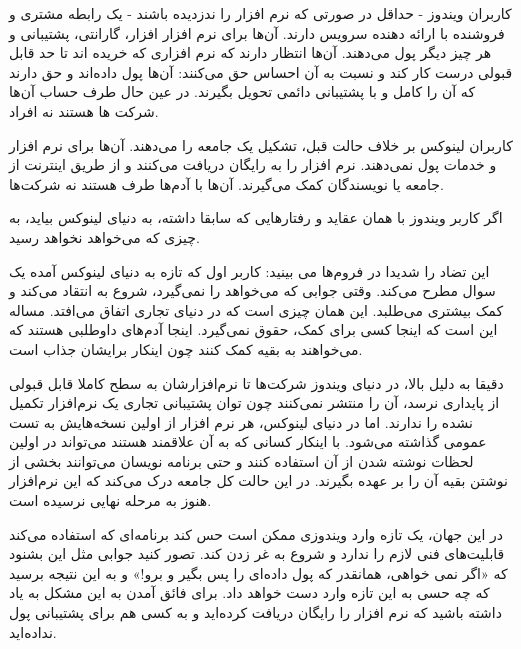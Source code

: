 کاربران ویندوز - حداقل در صورتی که نرم افزار را ندزدیده باشند - یک رابطه مشتری و فروشنده با ارائه دهنده سرویس دارند. آن‌ها برای نرم افزار افزار، گارانتی، پشتیبانی و هر چیز دیگر پول می‌دهند. آن‌ها انتظار دارند که نرم افزاری که خریده اند تا حد قابل قبولی درست کار کند و نسبت به آن احساس حق می‌کنند: آن‌ها پول داده‌اند و حق دارند که آن را کامل و با پشتیبانی دائمی تحویل بگیرند. در عین حال طرف حساب آن‌ها شرکت ها هستند نه افراد.

کاربران لینوکس بر خلاف حالت قبل، تشکیل یک جامعه را می‌دهند. آن‌ها برای نرم افزار و خدمات پول نمی‌دهند. نرم افزار را به رایگان دریافت می‌کنند و از طریق اینترنت از جامعه یا نویسندگان کمک می‌گیرند. آن‌ها با آدم‌ها طرف هستند نه شرکت‌ها.

اگر کاربر ویندوز با همان عقاید و رفتارهایی که سابقا داشته، به دنیای لینوکس بیاید، به چیزی که می‌خواهد نخواهد رسید.

این تضاد را شدیدا در فروم‌ها می بینید: کاربر اول که تازه به دنیای لینوکس آمده یک سوال مطرح می‌کند. وقتی جوابی که می‌خواهد را نمی‌گیرد، شروع به انتقاد می‌کند و کمک بیشتری می‌طلبد. این همان چیزی است که در دنیای تجاری اتفاق می‌افتد. مساله این است که اینجا کسی برای کمک، حقوق نمی‌گیرد. اینجا آدم‌های داوطلبی هستند که می‌خواهند به بقیه کمک کنند چون اینکار برایشان جذاب است.

دقیقا به دلیل بالا، در دنیای ویندوز شرکت‌ها تا نرم‌افزارشان به سطح کاملا قابل قبولی از پایداری نرسد، آن را منتشر نمی‌کنند چون توان پشتیبانی تجاری یک نرم‌افزار تکمیل نشده را ندارند. اما در دنیای لینوکس، هر نرم افزار از اولین نسخه‌هایش به تست عمومی گذاشته می‌شود. با اینکار کسانی که به آن علاقمند هستند می‌تواند در اولین لحظات نوشته شدن از آن استفاده کنند و حتی برنامه نویسان می‌توانند بخشی از نوشتن بقیه آن را بر عهده بگیرند. در این حالت کل جامعه درک می‌کند که این نرم‌افزار هنوز به مرحله نهایی نرسیده است.

در این جهان، یک تازه وارد ویندوزی ممکن است حس کند برنامه‌ای که استفاده می‌کند قابلیت‌های فنی لازم را ندارد و شروع به غر زدن کند. تصور کنید جوابی مثل این بشنود که «اگر نمی خواهی، همانقدر که پول داده‌ای را پس بگیر و برو!» و به این نتیجه برسید که چه حسی به این تازه وارد دست خواهد داد.
برای فائق آمدن به این مشکل به یاد داشته باشید که نرم افزار را رایگان دریافت کرده‌اید و به کسی هم برای پشتیبانی پول نداده‌اید.
